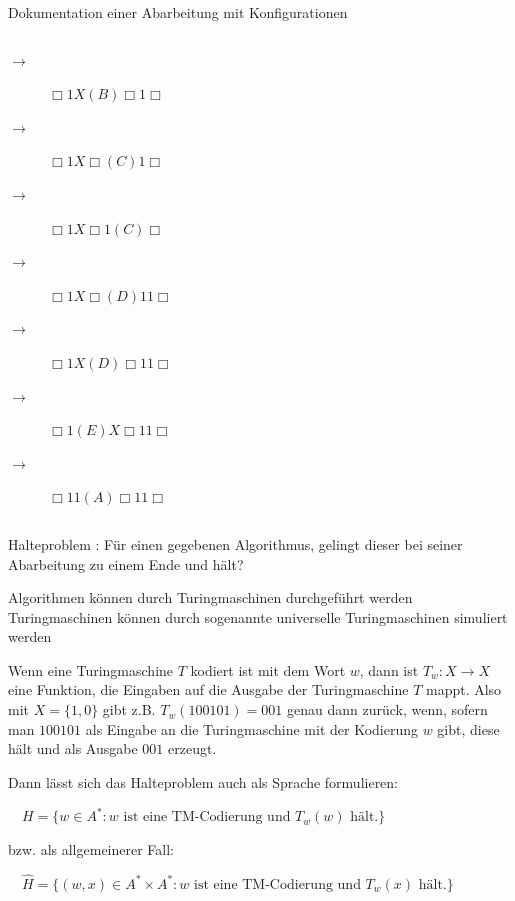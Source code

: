 \begin{frame}{Dokumentation einer Abarbeitung mit Konfigurationen}
\begin{columns}
		\begin{column}{0.4\textwidth}
			\begin{description}
				\pause\item[$\rightarrow$] $\Box 1 X (B) \Box 1\Box$
				\pause\item[$\rightarrow$] $\Box 1 X \Box (C) 1\Box$
				\pause\item[$\rightarrow$] $\Box 1 X \Box 1 (C)\Box$
				\pause\item[$\rightarrow$] $\Box 1 X \Box (D) 1 1\Box$
				\pause\item[$\rightarrow$] $\Box 1 X (D) \Box 1 1\Box$
				\pause\item[$\rightarrow$] $\Box 1 (E) X \Box 1 1\Box$
				\pause\item[$\rightarrow$] $\Box 1 1 (A) \Box 1 1\Box$
			\end{description}
		\end{column}
	\end{columns}
\end{frame}

\begin{frame}{Halteproblem}
	: Für einen gegebenen Algorithmus, gelingt dieser bei seiner Abarbeitung zu einem Ende und hält?
	
	\begin{itemize}
		\pitem Algorithmen können durch Turingmaschinen durchgeführt werden
		\pitem Turingmaschinen können durch sogenannte universelle Turingmaschinen simuliert werden
		\begin{itemize}
			\pitem Wenn eine Turingmaschine $T$ kodiert ist mit dem Wort $w$, dann ist $T_w: X \rightarrow X$ eine Funktion, die Eingaben auf die Ausgabe der Turingmaschine $T$ mappt.
			\pitem Also mit $X = \{1,0\}$ gibt z.B. $T_w(100101) = 001$ genau dann zurück, wenn, sofern man $100101$ als Eingabe an die Turingmaschine mit der Kodierung $w$ gibt, diese hält und als Ausgabe $001$ erzeugt.
		\end{itemize}
	\end{itemize}

	\bp
	
	Dann lässt sich das Halteproblem auch als Sprache formulieren:
	
	\vspace{.2cm}
	
	$\quad H = \{w \in A^* : w \text{ ist eine TM-Codierung und } T_w(w) \text{ hält.}\}$
	
	bzw. als allgemeinerer Fall:
	
	$\quad \hat{H} = \{(w,x) \in A^* \times A^* : w \text{ ist eine TM-Codierung und } T_w(x) \text{ hält.}\}$
\end{frame}


